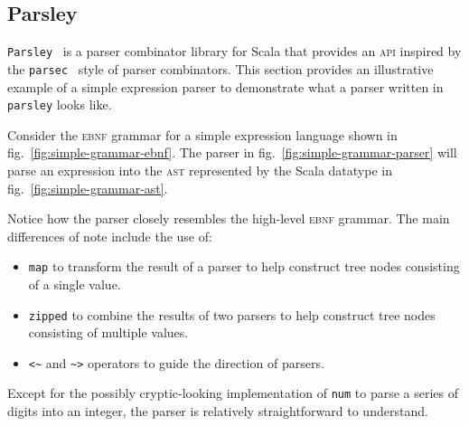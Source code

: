 \documentclass[../../main.tex]{subfiles}
\begin{document}

\subsection{Parsley}

\texttt{Parsley}~\cite{willis_garnishing_2018} is a parser combinator library for Scala that provides an \textsc{api} inspired by the \texttt{parsec}~\cite{leijen_parsec_2001} style of parser combinators.
This section provides an illustrative example of a simple expression parser to demonstrate what a parser written in \texttt{parsley} looks like.

Consider the \textsc{ebnf} grammar for a simple expression language shown in fig.~\ref{fig:simple-grammar-ebnf}.
The parser in fig.~\ref{fig:simple-grammar-parser} will parse an expression into the \textsc{ast} represented by the Scala datatype in fig.~\ref{fig:simple-grammar-ast}.

Notice how the parser closely resembles the high-level \textsc{ebnf} grammar.
The main differences of note include the use of:
\begin{itemize}
  \item \texttt{map} to transform the result of a parser to help construct tree nodes consisting of a single value.
  \item \texttt{zipped} to combine the results of two parsers to help construct tree nodes consisting of multiple values.
  \item \texttt{<\textasciitilde} and \texttt{\textasciitilde>} operators to guide the direction of parsers.
\end{itemize}
Except for the possibly cryptic-looking implementation of \texttt{num} to parse a series of digits into an integer, the parser is relatively straightforward to understand.
\end{document}
